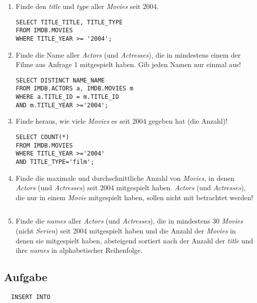 \documentclass[11pt,a4paper,DIV=9]{scrartcl}
\newcounter{temp}
\newcommand{\aufgabe}[1]{
  \setcounter{temp}{\value{subsection}}
  \setcounter{subsection}{#1}
  \addtocounter{subsection}{-1}
  \subsection{Aufgabe}
  \setcounter{subsection}{\value{temp}}
}
\begin{document}
\begin{enumerate}
\item Finde den \textit{title} und \textit{type} aller \textit{Movies} seit 2004. 
\begin{lstlisting} 
SELECT TITLE_TITLE, TITLE_TYPE
FROM IMDB.MOVIES
WHERE TITLE_YEAR >= '2004';
\end{lstlisting}
\item Finde die Name aller \textit{Actors} (und \textit{Actresses}), die in mindestens einem der Filme aus Anfrage 1 mitgespielt haben. Gib jeden Namen nur einmal aus!
\begin{lstlisting}
SELECT DISTINCT NAME_NAME
FROM IMDB.ACTORS a, IMDB.MOVIES m
WHERE a.TITLE_ID = m.TITLE_ID
AND m.TITLE_YEAR >='2004';
\end{lstlisting}
\item Finde heraus, wie viele \textit{Movies} es seit 2004 gegeben hat (die Anzahl)!
\begin{lstlisting}
SELECT COUNT(*)
FROM IMDB.MOVIES
WHERE TITLE_YEAR >='2004'
AND TITLE_TYPE='film';
\end{lstlisting}
\item Finde die maximale und durchschnittliche Anzahl von \textit{Movies}, in denen \textit{Actors} (und \textit{Actresses}) seit 2004 mitgespielt haben. \textit{Actors} (und \textit{Actresses}), die nur in einem \textit{Movie} mitgespielt haben, sollen nicht mit betrachtet werden!
\begin{lstlisting}
\end{lstlisting}
\item Finde die \textit{names} aller \textit{Actors} (und \textit{Actresses}), die in mindestens 30 \textit{Movies} (nicht \textit{Serien}) seit 2004 mitgespielt haben und die Anzahl der \textit{Movies} in denen sie mitgespielt haben, absteigend sortiert nach der Anzahl der \textit{title} und ihre \textit{names} in alphabetischer Reihenfolge.
\end{enumerate}
\aufgabe{4}
\begin{lstlisting}
  INSERT INTO
\end{lstlisting}
\end{document}
